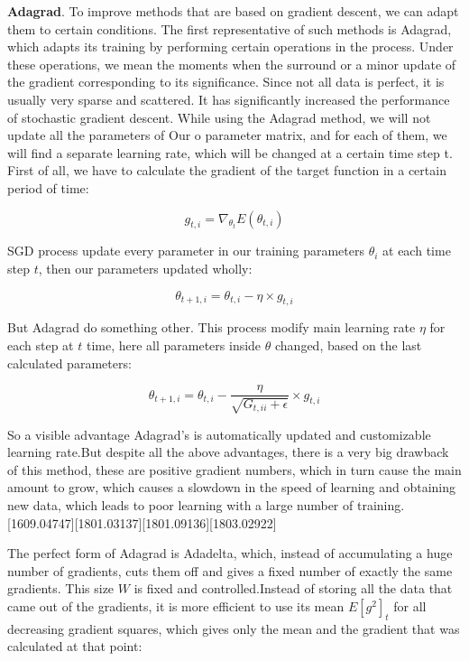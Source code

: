 \par \textbf{Adagrad}. To improve methods that are based on gradient descent, we can adapt them to certain conditions. The first representative of such methods is Adagrad, which adapts its training by performing certain operations in the process. Under these operations, we mean the moments when the surround or a minor update of the gradient corresponding to its significance. Since not all data is perfect, it is usually very sparse and scattered. It has significantly increased the performance of stochastic gradient descent. While using the Adagrad method, we will not update all the parameters of Our o parameter matrix, and for each of them, we will find a separate learning rate, which will be changed at a certain time step t. First of all, we have to calculate the gradient of the target function in a certain period of time:

\begin{equation}
g_{t,i} = \nabla_{\theta_t} E(\theta_{t,i})
\end{equation}

\noindent SGD process update every parameter in our training parameters $\theta_i$ at each time step $t$, then our parameters updated wholly:

\begin{equation}
\theta_{t+1,i} = \theta_{t,i} - \eta \times g_{t,i}
\end{equation}

\noindent But Adagrad do something other. This process modify main learning rate $\eta$ for each step at $t$ time, here all parameters inside $\theta$ changed, based on the last calculated parameters:

\begin{equation}
\theta_{t+1, i} = \theta_{t,i} - \dfrac{\eta}{\sqrt{G_{t,ii}+\epsilon}}\times g_{t,i}
\end{equation}

\par So a visible advantage Adagrad's is automatically updated and customizable learning rate.But despite all the above advantages, there is a very big drawback of this method, these are positive gradient numbers, which in turn cause the main amount to grow, which causes a slowdown in the speed of learning and obtaining new data, which leads to poor learning with a large number of training.[1609.04747][1801.03137][1801.09136][1803.02922]

\par The perfect form of Adagrad is Adadelta, which, instead of accumulating a huge number of gradients, cuts them off and gives a fixed number of exactly the same gradients. This size $W$ is fixed and controlled.Instead of storing all the data that came out of the gradients, it is more efficient to use its mean $E[g^2]_t$ for all decreasing gradient squares, which gives only the mean and the gradient that was calculated at that point:


